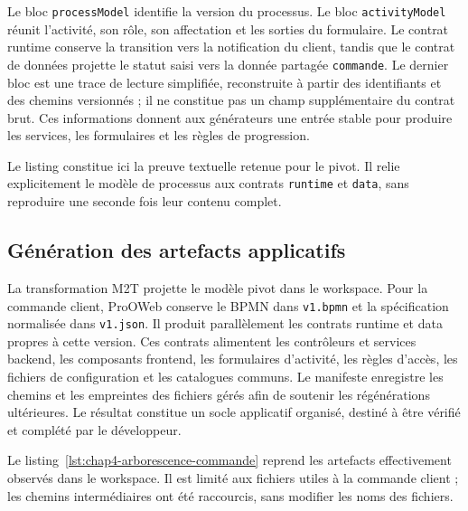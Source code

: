 Le bloc \texttt{process\allowbreak Model} identifie la version du processus. Le bloc
\texttt{activity\allowbreak Model} réunit l'activité, son rôle, son affectation et les
sorties du formulaire. Le contrat runtime conserve la transition vers
la notification du client, tandis que le contrat de données projette le
statut saisi vers la donnée partagée \texttt{commande}. Le dernier bloc est une
trace de lecture simplifiée, reconstruite à partir des identifiants et des
chemins versionnés ; il ne constitue pas un champ supplémentaire du contrat
brut. Ces informations donnent aux générateurs une entrée stable pour produire
les services, les formulaires et les règles de progression.

Le listing constitue ici la preuve textuelle retenue pour le pivot. Il relie
explicitement le modèle de processus aux contrats \texttt{runtime} et
\texttt{data}, sans reproduire une seconde fois leur contenu complet.

\subsection{Génération des artefacts applicatifs}

La transformation M2T projette le modèle pivot dans le workspace. Pour la
commande client, ProOWeb conserve le BPMN dans \texttt{v1.bpmn} et la
spécification normalisée dans \texttt{v1.json}. Il produit parallèlement les
contrats runtime et data propres à cette version. Ces contrats alimentent les
contrôleurs et services backend, les composants frontend, les formulaires d'activité, les
règles d'accès, les fichiers de configuration et les catalogues communs. Le
manifeste enregistre les chemins et les empreintes des fichiers gérés afin de
soutenir les régénérations ultérieures. Le résultat constitue un socle
applicatif organisé, destiné à être vérifié et complété par le développeur.

Le listing~\ref{lst:chap4-arborescence-commande} reprend les artefacts
effectivement observés dans le workspace. Il est limité aux fichiers utiles à
la commande client ; les chemins intermédiaires ont été raccourcis, sans
modifier les noms des fichiers.

